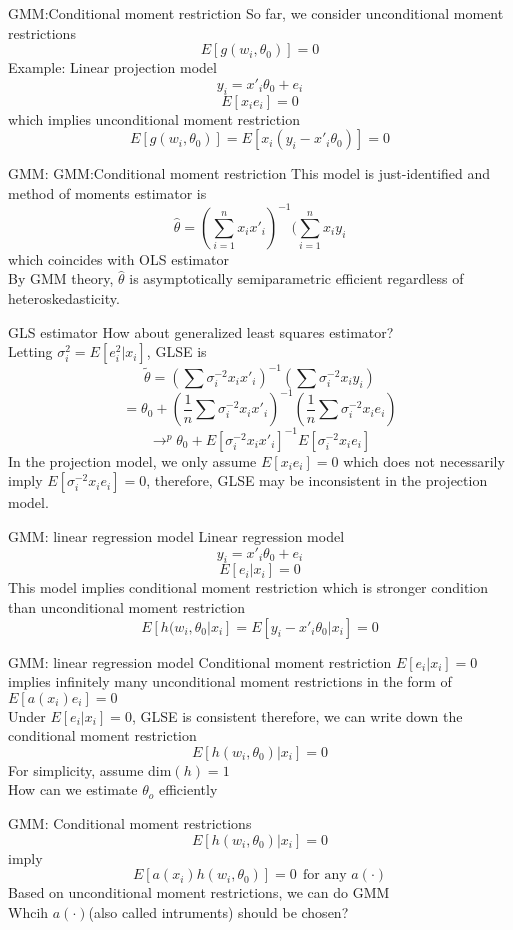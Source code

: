 \documentclass{beamer}
\begin{document}
\begin{frame}{GMM:Conditional moment restriction}
	So far, we consider unconditional moment restrictions
	\[E[g(w_i,\theta_0)]=0\]
	Example: Linear projection model
	\[y_i = x'_i \theta_0 +e_i\]
	\[E[x_ie_i] = 0\]
which implies unconditional moment restriction
\[E[g(w_i, \theta_0)] = E[x_i(y_i - x'_i \theta_0)] = 0\]
\end{frame}
\begin{frame}{GMM: GMM:Conditional moment restriction}
	This model is just-identified and method of moments estimator is 
	\[\hat{\theta} = (\sum^n_{i=1} x_i x'_i)^{-1} (\sum^n_{i=1} x_i y_i\]
		which coincides with OLS estimator \\
	By GMM theory, $\hat{\theta}$ is asymptotically semiparametric efficient regardless of heteroskedasticity.
\end{frame}
\begin{frame}{GLS estimator }
	How about generalized least squares estimator? \\
	Letting $\sigma^2_i = E[e^2_i|x_i]$, GLSE is 
	\[\tilde{\theta}  = (\sum \sigma^{-2}_i x_i x'_i)^{-1} (\sum \sigma^{-2}_i x_i y_i)\]
	\[ = \theta_0 + (\frac{1}{n} \sum \sigma^{-2}_i x_i x'_i)^{-1} (\frac{1}{n} \sum \sigma^{-2}_i x_i e_i)\]
	\[\rightarrow^p \theta_0 + E[\sigma^{-2}_i x_i x'_i]^{-1} E[\sigma^{-2}_i x_i e_i]\]
	In the projection model, we only assume $E[x_i e_i] =0$ which does not necessarily imply $E[\sigma^{-2}_i x_i e_i]=0$, therefore, GLSE may be inconsistent in the projection model.
\end{frame}
\begin{frame}{GMM: linear regression model}
	Linear regression model
	\[y_i = x'_i \theta_0 + e_i\]
	\[E[e_i|x_i] = 0\]
	This model implies conditional moment restriction which is stronger condition than unconditional moment restriction
	\[E[h(w_i,\theta_0|x_i] = E[y_i-x'_i \theta_0|x_i] = 0\]
\end{frame}
\begin{frame}{GMM: linear regression model}
	Conditional moment restriction $E[e_i|x_i]=0$ implies infinitely many unconditional moment restrictions in the form of $E[a(x_i)e_i]=0$ \\
	Under $E[e_i|x_i]=0$, GLSE is consistent
	therefore, we can write down the conditional moment restriction
	\[E[h(w_i,\theta_0)|x_i]=0\]
	For simplicity, assume dim$(h)=1$ \\
	How can we estimate $\theta_o$ efficiently
\end{frame}
\begin{frame}{GMM: Conditional moment restrictions}
	\[E[h(w_i,\theta_0)|x_i]=0 \]
		imply
		\[E[a(x_i) h(w_i,\theta_0)] =0 \ \ \text{for any } a(\cdot)\]
	Based on unconditional moment restrictions, we can do GMM \\
	Whcih $a(\cdot)$(also called intruments) should be chosen?
\end{frame}
\end{document}
